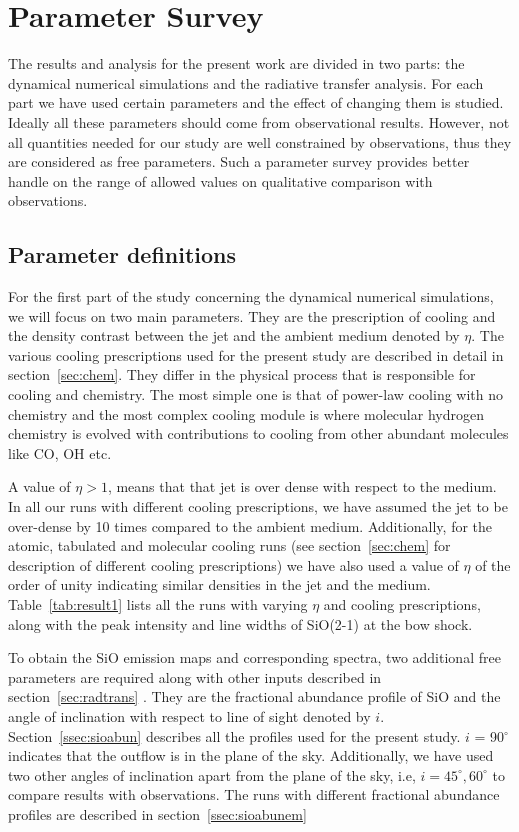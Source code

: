 \documentclass[useAMS,usenatbib]{mn2e}
\begin{document}




\section{Parameter Survey}
\label{sec:parasurvey}
The results and analysis for the present work are divided in two parts: the dynamical numerical simulations and the
radiative transfer analysis. For each part we have used certain parameters
and the effect of changing them is studied. Ideally all these parameters should come from observational
results. However, not all quantities needed for our study are well
constrained by observations, thus they are considered as
free parameters. Such a parameter survey provides better handle on the range of allowed
values on qualitative comparison with observations. 
%

\subsection{Parameter definitions}
\label{ssec:paradef}
For the first part of the study concerning the dynamical numerical
simulations, we will focus on two main parameters. They are the
prescription of cooling and the density contrast between the jet and
the ambient medium denoted by $\eta$. The various cooling prescriptions used for the present study are
described in detail in section~\ref{sec:chem}. They differ in the
physical process that is responsible for cooling and chemistry. The
most simple one is that of power-law cooling with no chemistry and the
most complex cooling module is where molecular hydrogen chemistry is
evolved with contributions to cooling from other abundant molecules
like CO, OH etc. 
%

A value of $\eta > 1$, means that
that jet is over dense with respect to the medium. In all our runs with
different cooling prescriptions, we have assumed the jet to be
over-dense by 10 times compared to the ambient medium. Additionally, for
the atomic, tabulated and molecular cooling runs (see section~\ref{sec:chem}
for description of different cooling prescriptions) we have also used a
value of $\eta$ of the order of unity indicating similar densities in
the jet and the medium. Table~\ref{tab:result1} lists all the runs with
varying $\eta$ and cooling prescriptions, along with the peak
intensity and line widths of SiO(2-1) at the bow shock.
%

To obtain the SiO emission maps and corresponding
spectra, two additional free parameters are required along with other
inputs described in section~\ref{sec:radtrans} . They are
the fractional abundance profile of SiO and the angle of inclination with
respect to line of sight denoted by $i$. Section~\ref{ssec:sioabun}
describes all the profiles used for the present study. $i$ = 90$^{\circ}$ indicates that
the outflow is in the plane of the sky. 
Additionally, we have used two other angles of inclination apart from the
plane of the sky, i.e, $i = 45^{\circ}, 60^{\circ}$ to compare
results with observations. The runs with different fractional
abundance profiles are described in section~\ref{ssec:sioabunem}
\end{document}
